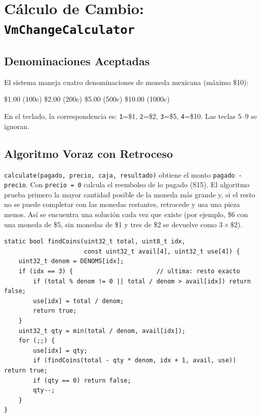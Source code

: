 \documentclass[12pt,a4paper]{article}
\begin{document}
\section{Cálculo de Cambio: \texttt{VmChangeCalculator}}

\subsection{Denominaciones Aceptadas}

El sistema maneja cuatro denominaciones de moneda mexicana (máximo \$10):

\begin{center}
\$1.00 (100c) \quad \$2.00 (200c) \quad \$5.00 (500c) \quad \$10.00 (1000c)
\end{center}

En el teclado, la correspondencia es: \texttt{1}=\$1, \texttt{2}=\$2,
\texttt{3}=\$5, \texttt{4}=\$10. Las teclas 5–9 se ignoran.

\subsection{Algoritmo Voraz con Retroceso}

\texttt{calculate(pagado, precio, caja, resultado)} obtiene el monto
\texttt{pagado - precio}. Con \texttt{precio = 0} calcula el reembolso de lo
pagado (S15). El algoritmo prueba primero la mayor cantidad posible de la
moneda más grande y, si el resto no se puede completar con las monedas
restantes, retrocede y usa una pieza menos. Así se encuentra una solución
cada vez que existe (por ejemplo, \$6 con una moneda de \$5, sin monedas de
\$1 y tres de \$2 se devuelve como $3\times\$2$).

\begin{lstlisting}[style=cpp, caption={Búsqueda de monedas en VmChangeCalculator}]
static bool findCoins(uint32_t total, uint8_t idx,
                      const uint32_t avail[4], uint32_t use[4]) {
    uint32_t denom = DENOMS[idx];
    if (idx == 3) {                       // ultima: resto exacto
        if (total % denom != 0 || total / denom > avail[idx]) return false;
        use[idx] = total / denom;
        return true;
    }
    uint32_t qty = min(total / denom, avail[idx]);
    for (;;) {
        use[idx] = qty;
        if (findCoins(total - qty * denom, idx + 1, avail, use)) return true;
        if (qty == 0) return false;
        qty--;
    }
}
\end{lstlisting}
\end{document}
